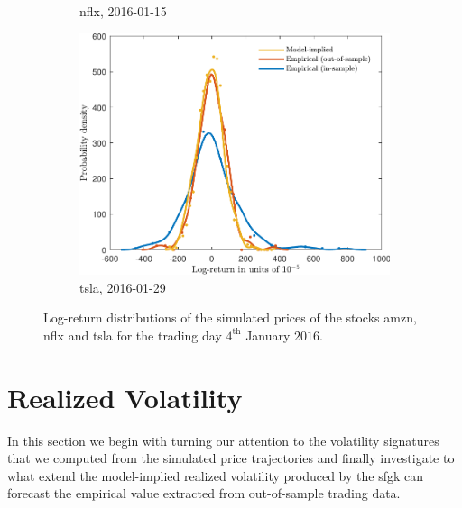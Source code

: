 \documentclass[11pt, a4paper]{thesis}  %
\begin{document}
\begin{figure}[H]
\begin{subfigure}[b]{0.5\textwidth}
        \caption{\ac{nflx}, 2016-01-15}
        \label{figure:results:log_distribution:nflx:20160104}
    \end{subfigure}
    \vfill
    \begin{subfigure}[b]{0.5\textwidth}
        \centering
        \includegraphics[width=\textwidth]{./SignaturePlot/TSLA/20160129/log_return_distribution.pdf}
        \caption{\ac{tsla}, 2016-01-29}
        \label{figure:results:log_distribution:tsla:20160104}
    \end{subfigure}

	\caption{Log-return distributions of the simulated prices of 
	the stocks \ac{amzn}, \ac{nflx} and \ac{tsla} for the 
	trading day $4^\textrm{th}$ January $2016$.}
	 \label{figure:result:log_return}
\end{figure}

%
% 

\section{Realized Volatility}
\label{section:result:realizedvol}

In this section we begin with turning our attention to the volatility signatures that we computed from the simulated price trajectories and finally investigate to what extend the model-implied realized volatility produced by the \ac{sfgk} can forecast the empirical value extracted from out-of-sample trading data.
\end{document}
